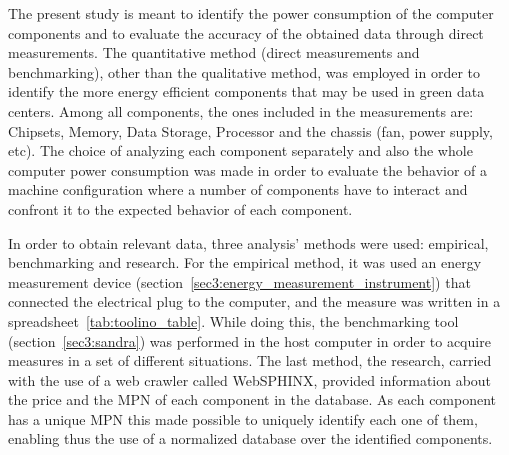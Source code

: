     The present study is meant to identify the power consumption of the computer components and to evaluate the accuracy of the obtained data through direct measurements. The quantitative method (direct measurements and benchmarking), other than the qualitative method, was employed in order to identify the more energy efficient components that may be used in green data centers. Among all components, the ones included in the measurements are: Chipsets, Memory, Data Storage, Processor and the chassis (fan, power supply, etc).
    The choice of analyzing each component separately and also the whole computer power consumption was made in order to evaluate the behavior of a machine configuration where a number of components have to interact and confront it to the expected behavior of each component.

    In order to obtain relevant data, three analysis' methods were used: empirical, benchmarking and research. For the empirical method, it was used an energy measurement device (section~\ref{sec3:energy_measurement_instrument}) that connected the electrical plug to the computer, and the measure was written in a spreadsheet~\ref{tab:toolino_table}. While doing this, the benchmarking tool (section~\ref{sec3:sandra}) was performed in the host computer in order to acquire measures in a set of different situations. The last method, the research, carried with the use of a web crawler called WebSPHINX, provided information about the price and the MPN of each component in the database. As each component has a unique MPN this made possible to uniquely identify each one of them, enabling thus the use of a normalized database over the identified components.

